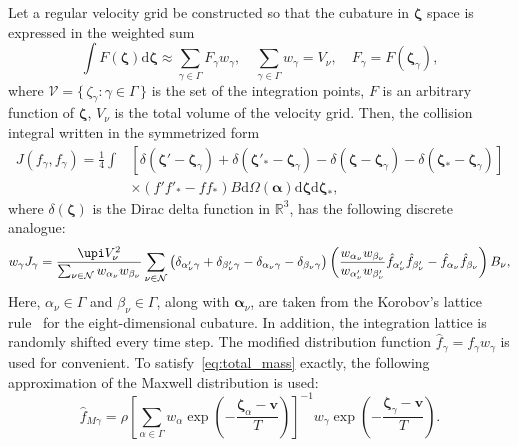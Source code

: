 \documentclass[]{jfm}
\newcommand{\dd}{\mathrm{d}}
\newcommand{\dzeta}{\boldsymbol{\dd\zeta}}
\newcommand{\bzeta}{\boldsymbol{\zeta}}
\newcommand{\Nu}{\mathcal{N}}
\newcommand{\Set}[2]{\{\,{#1}:{#2}\,\}}
\begin{document}
Let a regular velocity grid be constructed so that
the cubature in \(\bzeta\) space is expressed in the weighted sum
\begin{equation}\label{eq:zeta_cubature}
    \int F(\bzeta) \dzeta \approx \sum_{\gamma\in\Gamma} F_\gamma w_\gamma,
        \quad \sum_{\gamma\in\Gamma} w_\gamma = V_\nu,
        \quad F_\gamma = F(\bzeta_\gamma),
\end{equation}
where \(\mathcal{V} = \Set{\zeta_\gamma}{\gamma\in\Gamma}\) is the set of the integration points,
\(F\) is an arbitrary function of \(\bzeta\),
\(V_\nu\) is the total volume of the velocity grid.
Then, the collision integral written in the symmetrized form
\begin{equation}\label{eq:symm_ci}
    \begin{aligned}
    J(f_\gamma, f_\gamma) = \frac14\int &\left[
        \delta(\bzeta'-\bzeta_\gamma) + \delta(\bzeta'_*-\bzeta_\gamma)
        - \delta(\bzeta-\bzeta_\gamma) - \delta(\bzeta_*-\bzeta_\gamma)\right] \\
        &\times(f'f'_* - ff_*)B \dd\Omega(\boldsymbol{\alpha}) \dzeta\dzeta_*,
    \end{aligned}
\end{equation}
where \(\delta(\bzeta)\) is the Dirac delta function in \(\mathbb{R}^3\),
has the following discrete analogue:
\begin{equation}\label{eq:discrete_symm_ci}
    w_\gamma J_\gamma = \frac{\upi V_\nu^2}{\sum_{\nu\in\Nu} w_{\alpha_\nu}w_{\beta_\nu}}
        \sum_{\nu\in\Nu} \left(
            \delta_{\alpha'_\nu\gamma} + \delta_{\beta'_\nu\gamma}
            - \delta_{\alpha_\nu\gamma} - \delta_{\beta_\nu\gamma}
        \right)\left(
            \frac{w_{\alpha_\nu}w_{\beta_\nu}}{w_{\alpha'_\nu}w_{\beta'_\nu}}
            \hat{f}_{\alpha'_\nu}\hat{f}_{\beta'_\nu} - \hat{f}_{\alpha_\nu}\hat{f}_{\beta_\nu}
        \right)B_\nu,
\end{equation}
Here, \(\alpha_\nu\in\Gamma\) and \(\beta_\nu\in\Gamma\), along with \(\boldsymbol{\alpha}_\nu\),
are taken from the Korobov's lattice rule~\citep{Korobov1959, Sloan1994}
for the eight-dimensional cubature.
In addition, the integration lattice is randomly shifted every time step.
The modified distribution function \(\hat{f}_\gamma = f_\gamma w_\gamma\) is used for convenient.
To satisfy~\eqref{eq:total_mass} exactly, the following approximation of the Maxwell distribution is used:
\begin{equation}\label{eq:discrete_Maxwell}
    \hat{f}_{M\gamma} = \rho\left[\sum_{\alpha\in\Gamma}w_\alpha\exp
            \left(-\frac{\bzeta_\alpha - \boldsymbol{v}}{T}\right)
        \right]^{-1}
        w_\gamma\exp\left(-\frac{\bzeta_\gamma - \boldsymbol{v}}{T}\right).
\end{equation}
\end{document}
